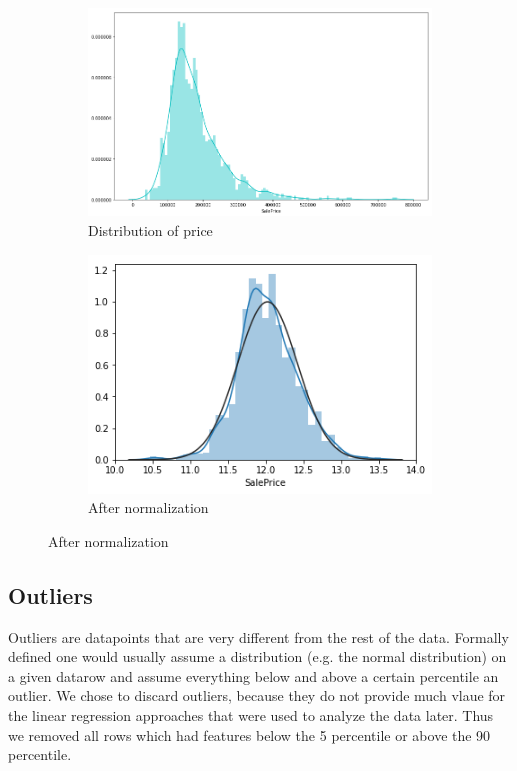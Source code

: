 \begin{figure}[h!]
  \centering
  \begin{subfigure}[b]{0.4\linewidth}
    \includegraphics[width=\linewidth]{images/price_distribution.png}
    \caption{Distribution of price}
  \end{subfigure}
  \begin{subfigure}[b]{0.4\linewidth}
    \includegraphics[width=\linewidth]{images/price_normalize_distribution.png}
    \caption{After normalization}
  \end{subfigure}
  \label{fig:dist}
\end{figure}

\subsection{Outliers}
Outliers are datapoints that are very different from the rest of the data. Formally defined one would usually assume a distribution (e.g. the normal distribution) on a given datarow and assume everything below and above a certain percentile an outlier.
 We chose to discard outliers, because they do not provide much vlaue for the linear regression approaches that were used to analyze the data later. Thus we removed all rows which had features below the 5 percentile or above the 90 percentile.\newline
